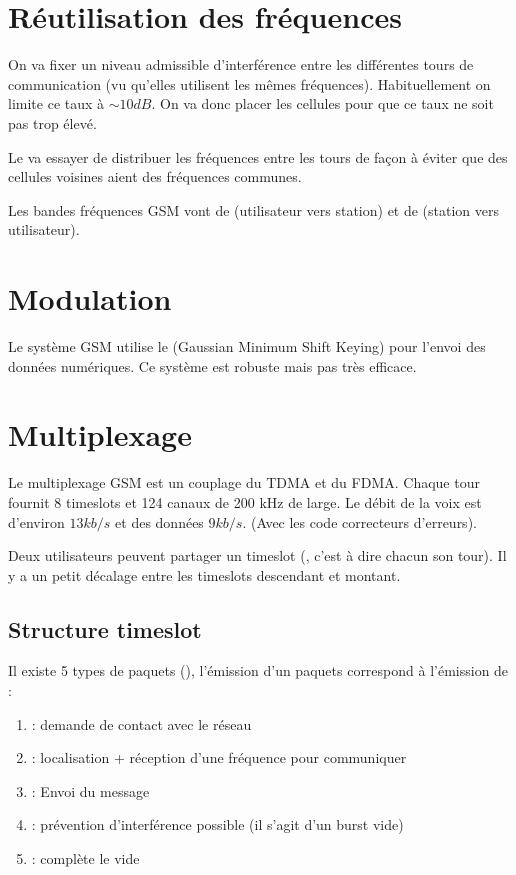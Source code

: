 \section{Réutilisation des fréquences}

On va fixer un niveau admissible d'interférence entre les différentes tours de communication (vu qu'elles utilisent les mêmes fréquences). Habituellement on limite ce taux à $\sim10 dB$. On va donc placer les cellules pour que ce taux ne soit pas trop élevé.

Le  va essayer de distribuer les fréquences entre les tours de façon à éviter que des cellules voisines aient des fréquences communes.

Les bandes fréquences GSM  vont de  (utilisateur vers station) et  de  (station vers utilisateur).

\section{Modulation}

Le système GSM utilise le  (Gaussian Minimum Shift Keying) pour l'envoi des données numériques. Ce système est robuste mais pas très efficace.

\section{Multiplexage}

Le multiplexage GSM est un couplage du TDMA et du FDMA. Chaque tour fournit 8 timeslots et 124 canaux de 200 kHz de large. Le débit de la voix est d'environ $13kb/s$ et des données $9 kb/s$.
(Avec les code correcteurs d'erreurs).

Deux utilisateurs peuvent partager un timeslot (, c'est à dire chacun son tour). Il y a un petit décalage entre les timeslots descendant et montant.

\subsection{Structure timeslot}

Il existe 5 types de paquets (), l’émission d'un paquets correspond à l'émission de :
\begin{enumerate}
  \item {}: demande de contact avec le réseau
  \item {}: localisation + réception d'une fréquence pour communiquer
  \item {}: Envoi du message
  \item {}: prévention d'interférence possible (il s'agit d'un burst vide)
  \item {}: complète le vide
\end{enumerate}

